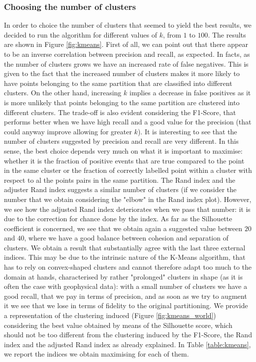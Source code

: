 \documentclass[a4paper]{article}
\begin{document}
	\subsubsection{Choosing the number of clusters}
	In order to choice the number of clusters that seemed to yield the best results, we decided to run the algorithm for different values of $k$, from $1$ to $100$. The results are shown in Figure \ref{fig:kmeans}.
	First of all, we can point out that there appear to be an inverse correlation between precision and recall, as expected. In facts, as the number of clusters grows we have an increased rate of false negatives. This is given to the fact that the increased number of clusters makes it more likely to have points belonging to the same partition that are classified into different clusters. On the other hand, increasing $k$ implies a decrease in false positives as it is more unlikely that points belonging to the same partition are clustered into different clusters.
	The trade-off is also evident considering the F1-Score, that performs better when we have high recall and a good value for the precision (that could anyway improve allowing for greater $k$).
	It is interesting to see that the number of clusters suggested by precision and recall are very different. In this sense, the best choice depends very much on what it is important to maximise: whether it is the fraction of positive events that are true compared to the point in the same cluster or the fraction of correctly labelled point within a cluster with respect to al the points pairs in the same partition.
	The Rand index and the adjuster Rand index suggests a similar number of clusters (if we consider the number that we obtain considering the "elbow" in the Rand index plot). However, we see how the adjusted Rand index deteriorates when we pass that number: it is due to the correction for chance done by the index.
	As far as the Silhouette coefficient is concerned, we see that we obtain again a suggested value between $20$ and $40$, where we have a good balance between cohesion and separation of clusters. We obtain a result that substantially agree with the last three external indices.
	This may be due to the intrinsic nature of the K-Means algorithm, that has to rely on convex-shaped clusters and cannot therefore adapt too much to the domain at hands, characterised by rather "prolonged" clusters in shape (as it is often the case with geophysical data): with a small number of clusters we have a good recall, that we pay in terms of precision, and as soon as we try to augment it we see that we lose in terms of fidelity to the original partitioning.
	We provide a representation of the clustering induced (Figure \ref{fig:kmeans_world}) considering the best value obtained by means of the Silhouette score, which should not be too different from the clustering induced by the F1-Score, the Rand index and the adjusted Rand index as already explained.
	In Table \ref{table:kmeans}, we report the indices we obtain maximising for each of them.\\
\end{document}
